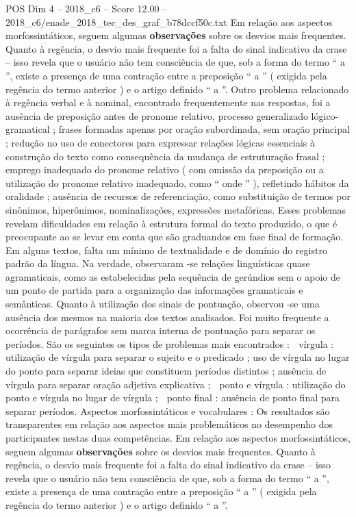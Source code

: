 \begin{textsample}{POS Dim 4 – 2018\_c6 – Score 12.00 – 2018\_c6/enade\_2018\_tec\_des\_graf\_b78dccf50c.txt}
Em relação aos aspectos morfossintáticos, seguem algumas \textbf{observações} sobre os desvios mais frequentes.
Quanto à regência, o desvio mais frequente foi a falta do sinal indicativo da crase – isso revela que o usuário não tem consciência de que, sob a forma do termo “ a ”, existe a presença de uma contração entre a preposição “ a ” ( exigida pela regência do termo anterior ) e o artigo definido “ a ”.
Outro problema relacionado à regência verbal e à nominal, encontrado frequentemente nas respostas, foi a ausência de preposição antes de pronome relativo, processo generalizado lógico-gramatical ; frases formadas apenas por oração subordinada, sem oração principal ; redução no uso de conectores para expressar relações lógicas essenciais à construção do texto como consequência da mudança de estruturação frasal ; emprego inadequado do pronome relativo ( com omissão da preposição ou a utilização do pronome relativo inadequado, como “ onde ” ), refletindo hábitos da oralidade ; ausência de recursos de referenciação, como substituição de termos por sinônimos, hiperônimos, nominalizações, expressões metafóricas.
Esses problemas revelam dificuldades em relação à estrutura formal do texto produzido, o que é preocupante ao se levar em conta que são graduandos em fase final de formação.
Em alguns textos, falta um mínimo de textualidade e de domínio do registro padrão da língua.
Na verdade, observaram -se relações linguísticas quase agramaticais, como as estabelecidas pela sequência de gerúndios sem o apoio de um ponto de partida para a organização das informações gramaticais e semânticas.
Quanto à utilização dos sinais de pontuação, observou -se uma ausência dos mesmos na maioria dos textos analisados.
Foi muito frequente a ocorrência de parágrafos sem marca interna de pontuação para separar os períodos.
São os seguintes os tipos de problemas mais encontrados :  vírgula : utilização de vírgula para separar o sujeito e o predicado ; uso de vírgula no lugar do ponto para separar ideias que constituem períodos distintos ; ausência de vírgula para separar oração adjetiva explicativa ;  ponto e vírgula : utilização do ponto e vírgula no lugar de vírgula ;  ponto final : ausência de ponto final para separar períodos.
Aspectos morfossintáticos e vocabulares : Os resultados são transparentes em relação aos aspectos mais problemáticos no desempenho dos participantes nestas duas competências.
Em relação aos aspectos morfossintáticos, seguem algumas \textbf{observações} sobre os desvios mais frequentes.
Quanto à regência, o desvio mais frequente foi a falta do sinal indicativo da crase – isso revela que o usuário não tem consciência de que, sob a forma do termo “ a ”, existe a presença de uma contração entre a preposição “ a ” ( exigida pela regência do termo anterior ) e o artigo definido “ a ”.

\end{textsample}
